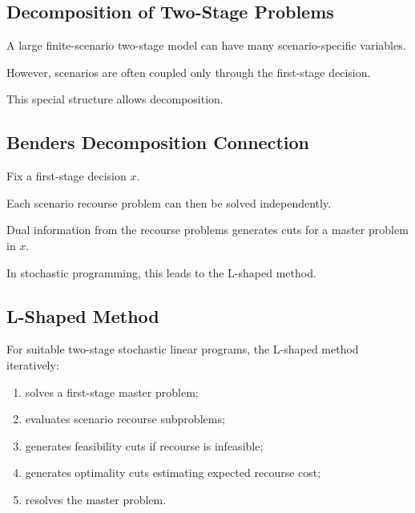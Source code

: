 \subsection{Decomposition of Two-Stage Problems}
\label{subsec:decomposition-two-stage-stochastic}

A large finite-scenario two-stage model can have many scenario-specific
variables.

However, scenarios are often coupled only through the first-stage
decision.

This special structure allows decomposition.

\subsection{Benders Decomposition Connection}
\label{subsec:benders-stochastic}

Fix a first-stage decision \(x\).

Each scenario recourse problem can then be solved independently.

Dual information from the recourse problems generates cuts for a master
problem in \(x\).

In stochastic programming, this leads to the L-shaped method.

\subsection{L-Shaped Method}
\label{subsec:l-shaped-method}

For suitable two-stage stochastic linear programs, the L-shaped method
iteratively:

\begin{enumerate}
    \item solves a first-stage master problem;
    \item evaluates scenario recourse subproblems;
    \item generates feasibility cuts if recourse is infeasible;
    \item generates optimality cuts estimating expected recourse cost;
    \item resolves the master problem.
\end{enumerate}

